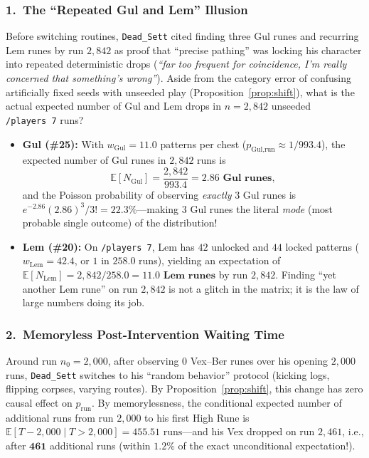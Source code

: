\documentclass[11pt,reqno]{amsart}
\theoremstyle{definition}
\begin{document}
\subsubsection*{1.\ The ``Repeated Gul and Lem'' Illusion}
Before switching routines, \texttt{Dead\_Sett} cited finding three Gul runes and recurring Lem runes by run $2{,}842$ as proof that ``precise pathing'' was locking his character into repeated deterministic drops (\emph{``far too frequent for coincidence, I'm really concerned that something's wrong''}). Aside from the category error of confusing artificially fixed seeds with unseeded play (Proposition~\ref{prop:shift}), what is the actual expected number of Gul and Lem drops in $n = 2{,}842$ unseeded \texttt{/players~7} runs?
\begin{itemize}
    \item \textbf{Gul (\#25):} With $w_{\text{Gul}} = 11.0$ patterns per chest ($p_{\text{Gul,run}} \approx 1 / 993.4$), the expected number of Gul runes in $2{,}842$ runs is
    \[
        \mathbb{E}[N_{\text{Gul}}] = \frac{2{,}842}{993.4} = \mathbf{2.86\text{ Gul runes}},
    \]
    and the Poisson probability of observing \emph{exactly} $3$ Gul runes is $e^{-2.86} (2.86)^3 / 3! = \mathbf{22.3\%}$—making $3$ Gul runes the literal \emph{mode} (most probable single outcome) of the distribution!
    \item \textbf{Lem (\#20):} On \texttt{/players~7}, Lem has $42$ unlocked and $44$ locked patterns ($w_{\text{Lem}} = 42.4$, or $1$ in $258.0$ runs), yielding an expectation of $\mathbb{E}[N_{\text{Lem}}] = 2{,}842 / 258.0 = \mathbf{11.0\text{ Lem runes}}$ by run $2{,}842$. Finding ``yet another Lem rune'' on run $2{,}842$ is not a glitch in the matrix; it is the law of large numbers doing its job.
\end{itemize}

\subsubsection*{2.\ Memoryless Post-Intervention Waiting Time}
Around run $n_0 = 2{,}000$, after observing $0$ Vex--Ber runes over his opening $2{,}000$ runs, \texttt{Dead\_Sett} switches to his ``random behavior'' protocol (kicking logs, flipping corpses, varying routes). By Proposition~\ref{prop:shift}, this change has zero causal effect on $p_{\text{run}}$. By memorylessness, the conditional expected number of additional runs from run $2{,}000$ to his first High Rune is $\mathbb{E}[T - 2{,}000 \mid T > 2{,}000] = \mathbf{455.51}\text{ runs}$—and his Vex dropped on run $2{,}461$, i.e., after $\mathbf{461}$ additional runs (within $1.2\%$ of the exact unconditional expectation!).
\end{document}
